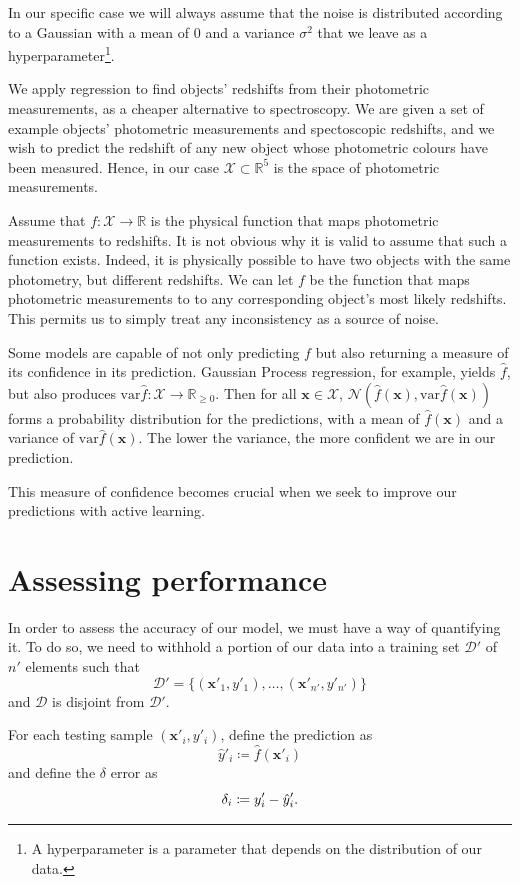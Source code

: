 \documentclass[11pt,twoside]{report}
\newcommand\bx{\mathbf{x}}
\newcommand\bbR{\mathbb{R}}
\newcommand\cD{\mathcal{D}}
\newcommand\cN{\mathcal{N}}
\newcommand\cX{\mathcal{X}}
\newcommand\var{\mathrm{var}}
\begin{document}
In our specific case we will always assume that the noise is distributed according to a Gaussian with a mean of $0$ and a variance $\sigma^2$ that we leave as a hyperparameter\footnote{A hyperparameter is a parameter that depends on the distribution of our data.}.

We apply regression to find objects' redshifts from their photometric measurements, as a cheaper alternative to spectroscopy. We are given a set of example objects' photometric measurements and spectoscopic redshifts, and we wish to predict the redshift of any new object whose photometric colours have been measured. Hence, in our case $\cX \subset \bbR^5$ is the space of photometric measurements.

Assume that $f : \cX \to \bbR$ is the physical function that maps photometric measurements to redshifts. It is not obvious why it is valid to assume that such a function exists. Indeed, it is physically possible to have two objects with the same photometry, but different redshifts. We can let $f$ be the function that maps photometric measurements to to any corresponding object's most likely redshifts. This permits us to simply treat any inconsistency as a source of noise.

Some models are capable of not only predicting $f$ but also returning a measure of its confidence in its prediction. Gaussian Process regression, for example, yields $\hat f$, but also produces $\var \hat f : \cX \to \bbR_{\geq0}$. Then for all $\bx \in \cX$, $\cN(\hat f(\bx), \var \hat f(\bx))$ forms a probability distribution for the predictions, with a mean of $\hat f(\bx)$ and a variance of $\var \hat f(\bx)$. The lower the variance, the more confident we are in our prediction.

This measure of confidence becomes crucial when we seek to improve our predictions with active learning.

\section{Assessing performance}

In order to assess the accuracy of our model, we must have a way of quantifying it. To do so, we need to withhold a portion of our data into a training set $\cD'$ of $n'$ elements such that \[
  \cD' = \{(\bx'_1, y'_1), \dots, (\bx'_{n'}, y'_{n'})\}
\] and $\cD$ is disjoint from $\cD'$.

For each testing sample $(\bx'_i, y'_i)$, define the prediction as\[
  \hat y'_i \coloneqq \hat f(\bx'_i)
\]
and define the $\delta$ error as \[
  \delta_i \coloneqq y'_i - \hat y'_i\text.
\]
\end{document}
